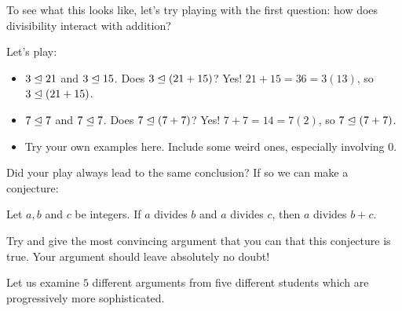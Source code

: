 To see what this looks like, let's try playing with the first question:  how does divisibility interact with addition?

Let's play:

\begin{itemize}
	\item $3 \trianglelefteq 21$ and $3 \trianglelefteq 15$.  Does $3 \trianglelefteq (21+15)$? Yes!  $21+15 = 36 = 3(13)$, so $3 \trianglelefteq (21+15)$.
	\item $7 \trianglelefteq 7$ and $7 \trianglelefteq 7$.  Does $7 \trianglelefteq (7+7)$?   Yes!  $7+7  =14 = 7(2)$, so $7 \trianglelefteq (7+7)$.
	\item Try your own examples here.  Include some weird ones, especially involving $0$.
\end{itemize}

Did your play always lead to the same conclusion?  If so we can make a conjecture:

\begin{conjecture}
	Let $a,b$ and $c$ be integers.  If $a$ divides $b$ and $a$ divides $c$, then $a$ divides $b+c$.
\end{conjecture}


\begin{stopthink}
	Try and give the most convincing argument that you can that this conjecture is true.  Your argument should leave absolutely no doubt!
\end{stopthink}

Let us examine $5$ different arguments from five different students which are progressively more sophisticated.  

